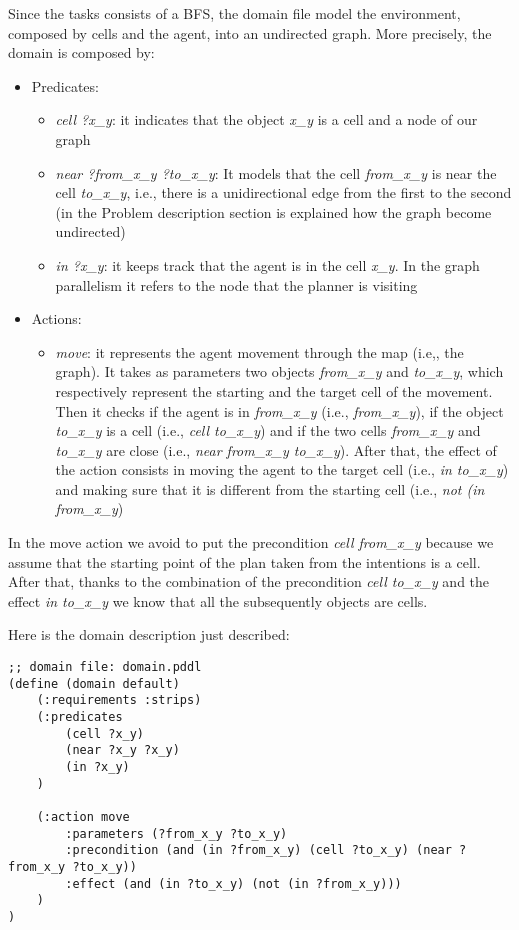 \documentclass[a4paper, 11pt]{article}
\begin{document}
Since the tasks consists of a BFS, the domain file model the environment, composed by cells and the agent, into an undirected graph.
More precisely, the domain is composed by:
\begin{itemize}
    \item Predicates:
    \begin{itemize}
        \item \emph{cell ?x\_y}: it indicates that the object \emph{x\_y} is a cell and a node of our graph
        \item \emph{near ?from\_x\_y ?to\_x\_y}: It models that the cell \emph{from\_x\_y} is near the cell \emph{to\_x\_y}, i.e., there is a unidirectional edge from the first to the second (in the Problem description section is explained how the graph become undirected)
        \item \emph{in ?x\_y}: it keeps track that the agent is in the cell \emph{x\_y}. In the graph parallelism it refers to the node that the planner is visiting
    \end{itemize}
    \item Actions:
    \begin{itemize}
        \item \emph{move}: it represents the agent movement through the map (i.e,, the graph). It takes as parameters two objects \emph{from\_x\_y} and \emph{to\_x\_y}, which respectively represent the starting and the target cell of the movement. Then it checks if the agent is in \emph{from\_x\_y} (i.e., \emph{from\_x\_y}), if the object \emph{to\_x\_y} is a cell (i.e., \emph{cell to\_x\_y}) and if the two cells \emph{from\_x\_y} and \emph{to\_x\_y} are close (i.e., \emph{near from\_x\_y to\_x\_y}).
        After that, the effect of the action consists in moving the agent to the target cell (i.e., \emph{in to\_x\_y}) and making sure that it is different from the starting cell (i.e., \emph{not (in from\_x\_y})
    \end{itemize}
\end{itemize}

In the move action we avoid to put the precondition \emph{cell from\_x\_y} because we assume that the starting point of the plan taken from the intentions is a cell. After that, thanks to the combination of the precondition \emph{cell to\_x\_y} and the effect \emph{in to\_x\_y} we know that all the subsequently objects are cells.

Here is the domain description just described:
\begin{verbatim}
;; domain file: domain.pddl
(define (domain default)
    (:requirements :strips)
    (:predicates
        (cell ?x_y)
        (near ?x_y ?x_y)
        (in ?x_y)
    )
    
    (:action move
        :parameters (?from_x_y ?to_x_y)
        :precondition (and (in ?from_x_y) (cell ?to_x_y) (near ?from_x_y ?to_x_y))
        :effect (and (in ?to_x_y) (not (in ?from_x_y)))
    )
)
\end{verbatim}
\end{document}
